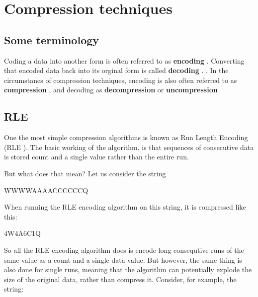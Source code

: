 \begin{comment}
  
\end{comment}

\chapter{Compression techniques}
\label{cha:digital-image}

\begin{refsection}

\section{Some terminology}
\label{sec:some-terminology}

Coding a data into another form is often referred to as
\textbf{encoding} . Converting that encoded data back
into its orginal form is called \textbf{decoding}
. . In the
circumstanes of compression techniques, encoding is also often
referred to as \textbf{compression} , and decoding as
\textbf{decompression}  or \textbf{uncompression} 


\section{RLE}
\label{sec:rle}

One the most simple compression algorithms is known as Run Length
Encoding (RLE
). \cite{nagarajan11:_enhan_approac_run_lengt_encod_schem}
The basic working of the algorithm, is that sequences of consecutive
data is stored count and a single value rather than the entire
run.

But what does that mean? Let us consider the string

\begin{indentpar}
  WWWWAAAACCCCCCQ
\end{indentpar}

When running the RLE encoding algorithm on this string, it is
compressed like this:

\begin{indentpar}
  4W4A6C1Q
\end{indentpar}

So all the RLE encoding algorithm does is encode long consequtive runs
of the same value as a count and a single data value. But however, the
same thing is also done for single runs, meaning that the algorithm
can potentially explode the size of the original data, rather than
compress it. Consider, for example, the string:


\end{refsection}
